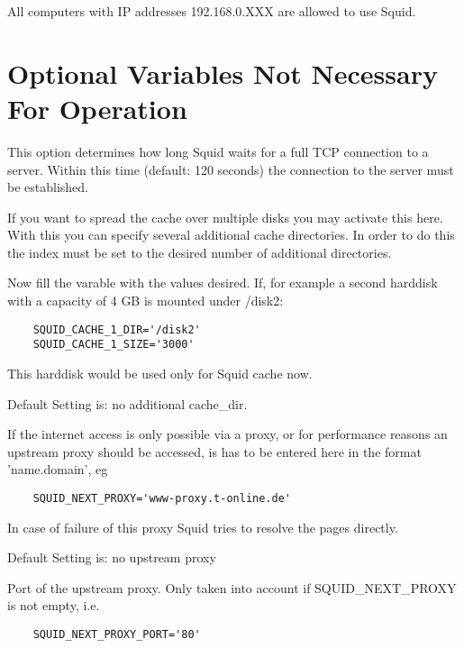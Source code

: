 \begin{description}
                All computers with IP addresses 192.168.0.XXX are allowed to use Squid.

\section{Optional Variables Not Necessary For Operation}


		This option determines how long Squid waits for a
		full TCP connection to a server. Within this
		time (default: 120 seconds) the connection to the server must
		be established.


		If you want to spread the cache over multiple disks
		you may activate this here. With this you can specify
		several additional cache directories. In order to
		do this the index must be set to the desired number of
		additional directories.

                Now fill the varable
                with the values desired. If, for example a second harddisk with
                a capacity of 4 GB is mounted under /disk2:
\begin{verbatim}
	SQUID_CACHE_1_DIR='/disk2'
	SQUID_CACHE_1_SIZE='3000'
\end{verbatim}
                This harddisk would be used only for Squid cache now.

                Default Setting is: no additional cache\_dir.



		If the internet access is only possible via a proxy,
		or for performance reasons an upstream proxy should
		be accessed, is has to be entered here in the format
		'name.domain', eg
\begin{verbatim}
	SQUID_NEXT_PROXY='www-proxy.t-online.de'
\end{verbatim}
		In case of failure of this proxy Squid tries to resolve the pages directly.

                Default Setting is: no upstream proxy



                Port of the upstream proxy. Only taken into account if
                SQUID\_NEXT\_PROXY is not empty, i.e.
\begin{verbatim}
	SQUID_NEXT_PROXY_PORT='80'
\end{verbatim}


\end{description}
